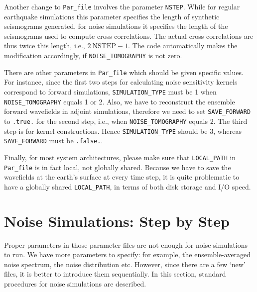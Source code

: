 Another change to \texttt{Par\_file} involves the parameter \texttt{NSTEP}.
While for regular earthquake simulations this parameter specifies
the length of synthetic seismograms generated, for noise simulations
it specifies the length of the seismograms used to compute cross correlations.
The actual cross correlations are thus twice this length, i.e., $2~\mathrm{NSTEP}-1$.
The code automatically makes the modification accordingly, if \texttt{NOISE\_TOMOGRAPHY}
is not zero.\newline


There are other parameters in \texttt{Par\_file} which should be given
specific values. For instance, since the first two steps for calculating
noise sensitivity kernels correspond to forward simulations, \texttt{SIMULATION\_TYPE}
must be 1 when \texttt{NOISE\_TOMOGRAPHY} equals 1 or 2. Also, we
have to reconstruct the ensemble forward wavefields in adjoint simulations,
therefore we need to set \texttt{SAVE\_FORWARD} to \texttt{.true.}
for the second step, i.e., when \texttt{NOISE\_TOMOGRAPHY} equals
2. The third step is for kernel constructions. Hence \texttt{SIMULATION\_TYPE}
should be 3, whereas \texttt{SAVE\_FORWARD} must be \texttt{.false.}.\newline


Finally, for most system architectures, please make sure that \texttt{LOCAL\_PATH}
in \texttt{Par\_file} is in fact local, not globally shared. Because
we have to save the wavefields at the earth's surface at every time
step, it is quite problematic to have a globally shared \texttt{LOCAL\_PATH},
in terms of both disk storage and I/O speed.


\section{Noise Simulations: Step by Step}

Proper parameters in those parameter files are not enough for noise
simulations to run. We have more parameters to specify: for example,
the ensemble-averaged noise spectrum, the noise distribution etc.
However, since there are a few `new' files, it is better to introduce
them sequentially. In this section, standard procedures for noise
simulations are described.


